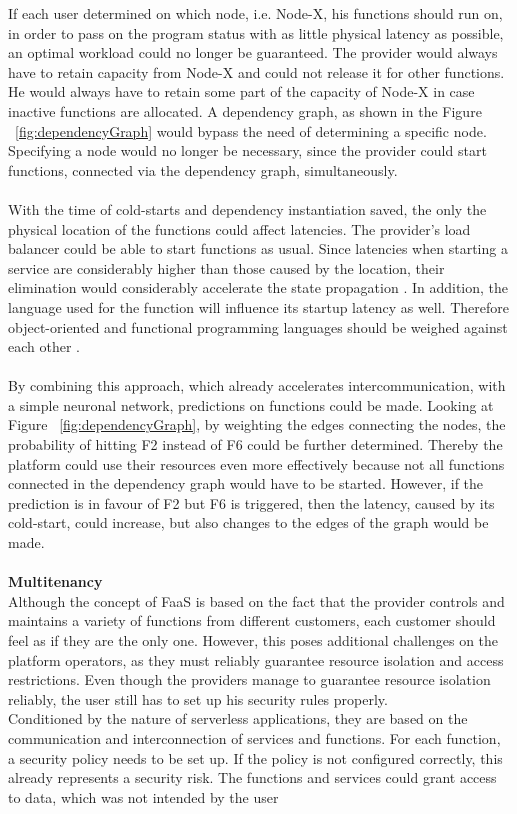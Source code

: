 \documentclass[a4paper,11pt, pagesize]{scrartcl}
\begin{document}
\begin{spacing}{1.2}
If each user determined on which node, i.e. Node-X, his functions should run on, in order to pass on the program status with as little physical latency as possible, an optimal workload could no longer be guaranteed. The provider would always have to retain capacity from Node-X and could not release it for other functions. He would always have to retain some part of the capacity of Node-X in case inactive functions are allocated. A dependency graph, as shown in the Figure ~\ref{fig:dependencyGraph} would bypass the need of determining a specific node. Specifying a node would no longer be necessary, since the provider could start functions, connected via the dependency graph, simultaneously.\\\\With the time of cold-starts and dependency instantiation saved, the only the physical location of the functions could affect latencies. The provider's load balancer could be able to start functions as usual. Since latencies when starting a service are considerably higher than those caused by the location, their elimination would considerably accelerate the state propagation \cite{aditya2019will} \cite{jackson2018investigation}. In addition, the language used for the function will influence its startup latency as well. Therefore object-oriented and functional programming languages should be weighed against each other \cite{manner2018cold}.\\\\ By combining this approach, which already accelerates intercommunication, with a simple neuronal network, predictions on functions could be made. Looking at Figure ~\ref{fig:dependencyGraph}, by weighting the edges connecting the nodes, the probability of hitting F2 instead of F6 could be further determined. Thereby the platform could use their resources even more effectively because not all functions connected in the dependency graph would have to be started. However, if the prediction is in favour of F2 but F6 is triggered, then the latency, caused by its cold-start, could increase, but also changes to the edges of the graph would be made.\\\\ \textbf{Multitenancy}\\ Although the concept of FaaS is based on the fact that the provider controls and maintains a variety of functions from different customers, each customer should feel as if they are the only one. However, this poses additional challenges on the platform operators, as they must reliably guarantee resource isolation and access restrictions. Even though the providers manage to guarantee resource isolation reliably, the user still has to set up his security rules properly.\\ Conditioned by the nature of serverless applications, they are based on the communication and interconnection of services and functions. For each function, a security policy needs to be set up. If the policy is not configured correctly, this already represents a security risk. The functions and services could grant access to data, which was not intended by the user 
\end{spacing}
\end{document}
